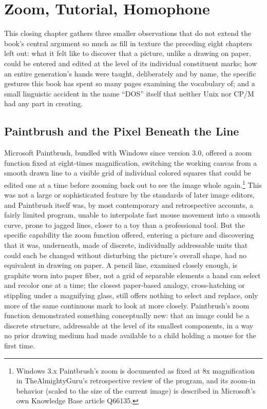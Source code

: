 \documentclass[11pt]{book}
\begin{document}
\chapter{Zoom, Tutorial, Homophone}

This closing chapter gathers three smaller observations that do not extend the book's central argument so much as fill in texture the preceding eight chapters left out: what it felt like to discover that a picture, unlike a drawing on paper, could be entered and edited at the level of its individual constituent marks; how an entire generation's hands were taught, deliberately and by name, the specific gestures this book has spent so many pages examining the vocabulary of; and a small linguistic accident in the name \enquote{DOS} itself that neither Unix nor CP/M had any part in creating.

\section{Paintbrush and the Pixel Beneath the Line}

Microsoft Paintbrush, bundled with Windows since version 3.0, offered a zoom function fixed at eight-times magnification, switching the working canvas from a smooth drawn line to a visible grid of individual colored squares that could be edited one at a time before zooming back out to see the image whole again.\footnote{Windows 3.x Paintbrush's zoom is documented as fixed at 8x magnification in TheAlmightyGuru's retrospective review of the program, and its zoom-in behavior (scaled to the size of the current image) is described in Microsoft's own Knowledge Base article Q66135.} This was not a large or sophisticated feature by the standards of later image editors, and Paintbrush itself was, by most contemporary and retrospective accounts, a fairly limited program, unable to interpolate fast mouse movement into a smooth curve, prone to jagged lines, closer to a toy than a professional tool. But the specific capability the zoom function offered, entering a picture and discovering that it was, underneath, made of discrete, individually addressable units that could each be changed without disturbing the picture's overall shape, had no equivalent in drawing on paper. A pencil line, examined closely enough, is graphite worn into paper fiber, not a grid of separable elements a hand can select and recolor one at a time; the closest paper-based analogy, cross-hatching or stippling under a magnifying glass, still offers nothing to select and replace, only more of the same continuous mark to look at more closely. Paintbrush's zoom function demonstrated something conceptually new: that an image could be a discrete structure, addressable at the level of its smallest components, in a way no prior drawing medium had made available to a child holding a mouse for the first time.
\end{document}
